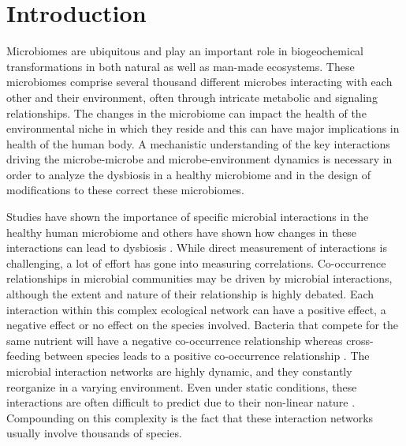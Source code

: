 
\section*{Introduction}

  Microbiomes are ubiquitous and play an important role in biogeochemical transformations in both natural as well as man-made ecosystems.
  These microbiomes comprise several thousand different microbes interacting with each other and their environment, often through intricate metabolic and signaling relationships.
  The changes in the microbiome can impact the health of the environmental niche in which they reside \cite{HumanMicrobiomeProjectConsortium2012,Lloyd-Price2016} and this can have major implications in health of the human body.
  A mechanistic understanding of the key interactions driving the microbe-microbe and microbe-environment dynamics is necessary in order to analyze the dysbiosis in a healthy microbiome and in the design of modifications to these correct these microbiomes.

  Studies have shown the importance of specific microbial interactions in the healthy human microbiome \cite{Lloyd-Price2016} and others have shown how changes in these interactions can lead to dysbiosis \cite{Wang2017,Gilbert2016,Belizario2015}.
  While direct measurement of interactions is challenging, a lot of effort has gone into measuring correlations.
  Co-occurrence relationships in microbial communities may be driven by microbial interactions, although the extent and nature of their relationship is highly debated.
  Each interaction within this complex ecological network can have a positive effect, a negative effect or no effect on the species involved.
  Bacteria that compete for the same nutrient will have a negative co-occurrence relationship \cite{Ghoul2016} whereas cross-feeding between species leads to a positive co-occurrence relationship \cite{DSouza2018}.
  The microbial interaction networks are highly dynamic, and they constantly reorganize in a varying environment.
  Even under static conditions, these interactions are often difficult to predict due to their non-linear nature \cite{Konopka2015}.
  Compounding on this complexity is the fact that these interaction networks usually involve thousands of species.

